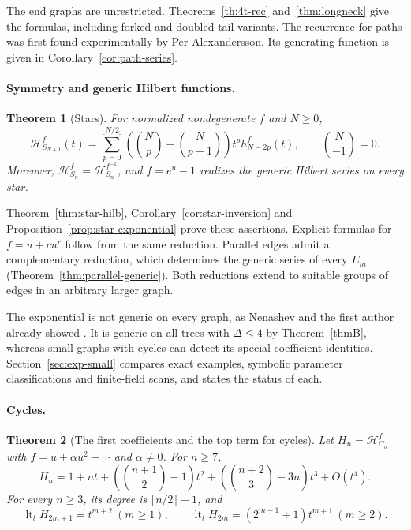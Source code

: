 \documentclass[reqno]{article}
\theoremstyle{plain} %
\newtheorem{mainthm}{Theorem}
\theoremstyle{definition}
\theoremstyle{remark}
\newcommand{\hs}{\mathscr{H}}
\numberwithin{equation}{section}
\begin{document}
The end graphs are unrestricted. Theorems~\ref{th:4t-rec}
and~\ref{thm:longneck} give the formulas, including forked and doubled
tail variants. The recurrence for paths was first found experimentally
by Per Alexandersson. Its generating function is given in
Corollary~\ref{cor:path-series}.

\paragraph{Symmetry and generic Hilbert functions.}

\begin{mainthm}[Stars]\label{thmD}
For normalized nondegenerate $f$ and $N\ge0$,
\[
 \hs_{S_{N+1}}^f(t)=
 \sum_{p=0}^{\lfloor N/2\rfloor}
 \left(\binom Np-\binom N{p-1}\right)t^p h_{N-2p}^f(t),
 \qquad \binom N{-1}=0.
\]
Moreover, $\hs_{S_n}^f=\hs_{S_n}^{f^{-1}}$, and $f=e^u-1$ realizes
the generic Hilbert series on every star.
\end{mainthm}

Theorem~\ref{thm:star-hilb}, Corollary~\ref{cor:star-inversion} and
Proposition~\ref{prop:star-exponential} prove these assertions. Explicit
formulas for $f=u+cu^r$ follow from the same reduction. Parallel edges
admit a complementary reduction, which determines the generic series
of every $E_m$ (Theorem~\ref{thm:parallel-generic}). Both reductions
extend to suitable groups of edges in an arbitrary larger graph.

The exponential is not generic on every graph, as Nenashev and the
first author already showed \cite[Example~2]{NSh}. It is generic on
all trees with $\Delta\le4$ by Theorem~\ref{thmB}, whereas small graphs
with cycles can detect its special coefficient identities.
Section~\ref{sec:exp-small} compares exact examples, symbolic parameter
classifications and finite-field scans, and states the status of each.

\paragraph{Cycles.}

\begin{mainthm}[The first coefficients and the top term for cycles]\label{thmE}
Let $H_n=\hs_{C_n}^f$ with $f=u+\alpha u^2+\cdots$ and $\alpha\ne0$.
For $n\ge7$,
\[
 H_n=1+nt+\left(\binom{n+1}{2}-1\right)t^2
          +\left(\binom{n+2}{3}-3n\right)t^3+O(t^4).
\]
For every $n\ge3$, its degree is $\lceil n/2\rceil+1$, and
\[
 \operatorname{lt}_tH_{2m+1}=t^{m+2}\ (m\ge1),\qquad
 \operatorname{lt}_tH_{2m}=(2^{m-1}+1)t^{m+1}\ (m\ge2).
\]
\end{mainthm}
\end{document}
